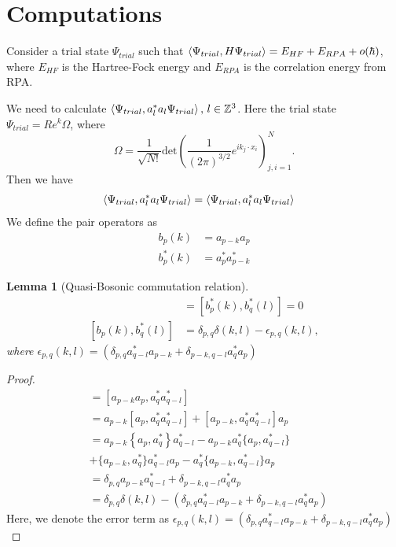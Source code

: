 \documentclass[sn-mathphys,Numbered]{sn-jnl}%
\theoremstyle{plain}
\newtheorem{lemma}[theorem]{Lemma}
\theoremstyle{definition}
\theoremstyle{remark}
\theoremstyle{plain}
\theoremstyle{definition}
\theoremstyle{remark}
\begin{document}
\section{Computations}\label{sec2}
Consider a trial state $\Psi_{trial}$ such that $\braket{\Psi_{trial},H\Psi_{trial}} = E_{HF} + E_{RPA}+ o(\hbar) $, where $E_{HF}$ is the Hartree-Fock energy and $E_{RPA}$ is the correlation energy from RPA.

We need to calculate $\braket{\Psi_{trial},a^*_la_l\Psi_{trial}},\, l\in\mathbb{Z}^3$. Here the trial state $\Psi_{trial}= Re^k\Omega$, where 
\begin{equation}
    \Omega = \frac{1}{\sqrt{N!}}\text{det}\left(\frac{1}{(2\pi)^{3/2}}e^{ik_j\cdot x_i}\right)^N_{j,i=1}.
\end{equation}
Then we have
\begin{align}
    \braket{\Psi_{trial},a^*_la_l\Psi_{trial}} &= \braket{\Psi_{trial},a^*_la_l\Psi_{trial}} 
\end{align}
We define the pair operators as
\begin{align}
    b_p(k) &= a_{p-k}a_{p}\\
    b^*_p(k) &= a^*_{p}a^*_{p-k}
\end{align}
\begin{lemma}[Quasi-Bosonic commutation relation]
   \begin{align}
       [b_{p}(k),b_{q}(l)] &= [b^*_{p}(k),b^*_{q}(l)] = 0\\
       [b_{p}(k),b^*_{q}(l)] &= \delta_{p,q}\delta(k,l) - \epsilon_{p,q}(k,l),
   \end{align} where $\epsilon_{p,q}(k,l) = \left(\delta_{p,q}a^*_{q-l}a_{p-k} + \delta_{p-k,q-l}a^*_{q}a_{p}\right)$ 
    \end{lemma}
\begin{proof}
    \begin{align}
        [b_{p}(k),b^*_{q}(l)] &= [a_{p-k}a_{p},a^*_{q}a^*_{q-l}]\\
        &= a_{p-k}[a_p,a^*_{q}a^*_{q-l}] + [a_{p-k},a^*_{q}a^*_{q-l}]a_{p}\\
        &= a_{p-k}\left\{a_p,a^*_{q}\right\}a^*_{q-l} - a_{p-k}a^*_{q}\{a_{p},a^*_{q-l}\}\nonumber \\ &+ \{a_{p-k},a^*_q\}a^*_{q-l}a_{p} - a^*_{q}\{a_{p-k},a^*_{q-l}\}a_{p}\\
        &=\delta_{p,q}a_{p-k}a^*_{q-l} + \delta_{p-k,q-l}a^*_{q}a_{p}\\
        &= \delta_{p,q}\delta(k,l)-\left(\delta_{p,q}a^*_{q-l}a_{p-k} + \delta_{p-k,q-l}a^*_{q}a_{p}\right)
    \end{align}
Here, we denote the error term as $\epsilon_{p,q}(k,l) = \left(\delta_{p,q}a^*_{q-l}a_{p-k} + \delta_{p-k,q-l}a^*_{q}a_{p}\right)$ 
\end{proof}
\end{document}
